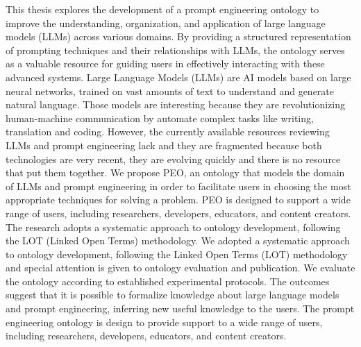 This thesis explores the development of a prompt engineering ontology to improve the understanding, organization, and application of large language models (LLMs) across various domains. By providing a structured representation of prompting techniques and their relationships with LLMs, the ontology serves as a valuable resource for guiding users in effectively interacting with these advanced systems.
Large Language Models (LLMs) are AI models based on large neural networks, trained on vast amounts of text to understand and generate natural language. Those models are interesting because they are revolutionizing human-machine communication by automate complex tasks like writing, translation and coding.
However, the currently available resources reviewing LLMs and prompt engineering lack and they are fragmented because both technologies are very recent, they are evolving quickly and there is no resource that  put them together.
We propose PEO, an ontology that models the domain of LLMs and prompt engineering in order to facilitate users in choosing the most appropriate techniques for solving a problem. PEO is designed to support a wide range of users, including researchers, developers, educators, and content creators. The research adopts a systematic approach to ontology development, following the LOT (Linked Open Terms) methodology.
We adopted a systematic approach to ontology development, following the Linked Open Terms (LOT) methodology and special attention is given to ontology evaluation and publication. We evaluate the ontology according to established experimental protocols.
The outcomes suggest that it is possible to formalize knowledge about large language models and prompt engineering, inferring new useful knowledge to the users.
The prompt engineering ontology is design to provide support to a wide range of users, including researchers, developers, educators, and content creators.